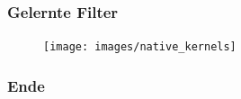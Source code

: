 \documentclass{beamer}
\begin{document}
\begin{frame}
\frametitle{Gelernte Filter}
\begin{figure}
	\centering
	\texttt{[image: images/native\_kernels]}
	\label{fig:nativekernels}
\end{figure}
\end{frame}

\begin{frame}
\frametitle{Ende}
\end{frame}
\end{document}

